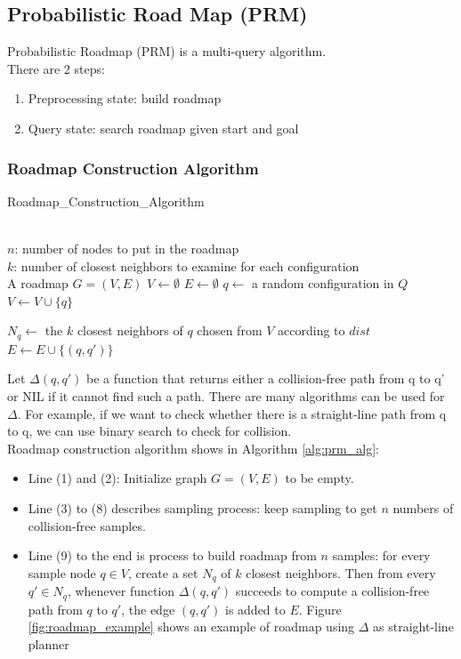 \documentclass[11pt]{article}
\begin{document}
\subsection{Probabilistic Road Map (PRM)}
Probabilistic Roadmap (PRM) is a multi-query algorithm.\\
There are 2 steps:
\begin{enumerate}
\item Preprocessing state: build roadmap
\item Query state: search roadmap given start and goal
\end{enumerate}

\subsubsection{Roadmap Construction Algorithm}
\begin{algorithm} 
\caption{Roadmap\_Construction\_Algorithm} 
\label{alg:prm_alg} 
  \begin{algorithmic}[1]
  \REQUIRE~~\\
    $n$: number of nodes to put in the roadmap\\
    $k$: number of closest neighbors to examine for each configuration
  \ENSURE~~\\
    A roadmap $G=(V,E)$
    \STATE $V \leftarrow \emptyset$ 
    \STATE $E \leftarrow \emptyset$
      \REPEAT
    \STATE $q \leftarrow$ a random configuration in $Q$      
      \STATE $V \leftarrow V \cup \{q\}$
    \ENDWHILE
    
    \STATE $N_q \leftarrow$ the $k$ closest neighbors of $q$ chosen from $V$ according to $dist$
        \STATE $E \leftarrow E \cup \{(q,q')\}$
      \ENDIF
    \ENDFOR
  \ENDFOR
    \end{algorithmic}
\end{algorithm}

Let $\Delta(q, q')$ be a function that returns either a collision-free path from q to q' or NIL if it cannot find such a path. There are many algorithms can be used for $\Delta$. For example, if we want to check whether there is a straight-line path from q to q, we can use binary search to check for collision.\\
Roadmap construction algorithm shows in Algorithm \ref{alg:prm_alg}:
\begin{itemize}
\item Line (1) and (2): Initialize graph $G=(V,E)$ to be empty.
\item Line (3) to (8) describes sampling process: keep sampling to get $n$ numbers of collision-free samples.
\item Line (9) to the end is process to build roadmap from $n$ samples: for every sample node $q\in V$, create a set $N_q$ of $k$ closest neighbors. Then from every $q' \in N_q$, whenever function $\Delta(q, q')$ succeeds to compute a collision-free path from $q$ to $q'$, the edge $(q,q')$ is added to $E$. Figure \ref{fig:roadmap_example} shows an example of roadmap using $\Delta$ as straight-line planner
\end{itemize}
\end{document}
